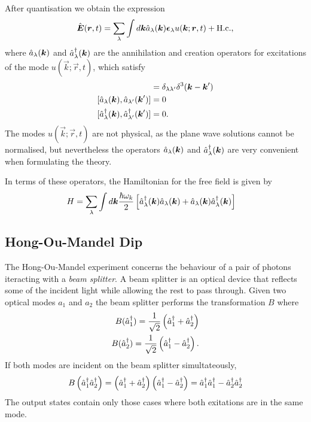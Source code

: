 After quantisation we obtain the expression
\begin{align}
  \hat{{\boldsymbol{E}}}({\boldsymbol{r}}, t) = \sum_\lambda \int d{\boldsymbol{k}} \hat{a}_\lambda({\boldsymbol{k}}){\boldsymbol{\epsilon}}_\lambda u({\boldsymbol{k}}; {\boldsymbol{r}}, t) + \text{H.c.},
\end{align}
where $\hat{a}_\lambda({\boldsymbol{k}})$ and $\hat{a}^\dagger_\lambda({\boldsymbol{k}})$ are the annihilation and creation operators for excitations of the mode $u(\vec{k}; \vec{r},t)$, which satisfy
\begin{align}
  [\an{a}_\lambda(\vec{k}), \cre{a}_{\lambda '}(\vec{k}')]  &= \delta_{\lambda\lambda '}\delta^3(\vec{k} - \vec{k}') \\
  [\an{a}_\lambda(\vec{k}), \an{a}_{\lambda '}(\vec{k}')]  &= 0 \\
  [\cre{a}_\lambda(\vec{k}), \cre{a}_{\lambda '}(\vec{k}')] &= 0.
\end{align}
The modes $u(\vec{k}; \vec{r}, t)$ are not physical, as the plane wave solutions cannot be normalised, but nevertheless the operators  $\hat{a}_\lambda({\boldsymbol{k}})$ and $\hat{a}^\dagger_\lambda({\boldsymbol{k}})$ are very convenient when formulating the theory.

In terms of these operators, the Hamiltonian for the free field is given by
\begin{align}
  H &= \sum_\lambda \int d{\boldsymbol{k}} \frac{\hbar\omega_k}{2} \left[ \hat{a}^\dagger_\lambda({\boldsymbol{k}})\hat{a}_\lambda({\boldsymbol{k}}) + \hat{a}_\lambda({\boldsymbol{k}})\hat{a}^\dagger_\lambda({\boldsymbol{k}}) \right]
\end{align}


\subsection{Hong-Ou-Mandel Dip}

The Hong-Ou-Mandel experiment concerns the behaviour of a pair of photons iteracting with a \textit{beam splitter}. A beam splitter is an optical device that reflects some of the incident light while allowing the rest to pass through. Given two optical modes $a_1$ and $a_2$ the beam splitter performs the transformation $B$ where
\begin{align}
  B (\hat{a}^\dagger_{1}) = \frac{1}{\sqrt{2}} \left(\hat{a}^\dagger_{1} + \hat{a}^\dagger_{2}\right) \\
  B (\hat{a}^\dagger_{2}) = \frac{1}{\sqrt{2}} \left(\hat{a}^\dagger_{1} - \hat{a}^\dagger_{2}\right).
\end{align}
If both modes are incident on the beam splitter simultateously,
\begin{align}
  B\left(\hat{a}^\dagger_{1}\hat{a}^\dagger_{2}\right) = \left(\hat{a}^\dagger_{1} + \hat{a}^\dagger_{2}\right) \left(\hat{a}^\dagger_{1} - \hat{a}^\dagger_{2}\right) = \hat{a}^\dagger_{1}\hat{a}^\dagger_{1} - \hat{a}^\dagger_{2}\hat{a}^\dagger_{2}
\end{align}
The output states contain only those cases where both exitations are in the same mode.

